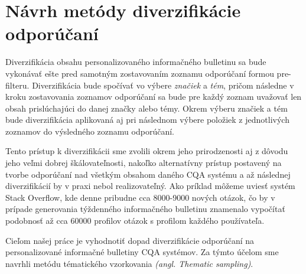 \section{Návrh metódy diverzifikácie odporúčaní}

Diverzifikácia obsahu personalizovaného informačného bulletinu sa bude vykonávať ešte pred samotným zostavovaním
zoznamu odporúčaní formou pre-filteru. Diverzifikácia bude spočívať vo výbere \textit{značiek} a \textit{tém}, pričom
následne v kroku zostavovania zoznamov odporúčaní sa bude pre každý zoznam uvažovať len obsah prislúchajúci do danej
značky alebo témy. Okrem výberu značiek a tém bude diverzifikácia aplikovaná aj pri následnom výbere položiek z jednotlivých
zoznamov do výsledného zoznamu odporúčaní.

Tento prístup k diverzifikácii sme zvolili okrem jeho prirodzenosti aj z dôvodu jeho veľmi dobrej škálovateľnosti,
nakoľko alternatívny prístup postavený na tvorbe odporúčaní nad všetkým obsahom daného CQA systému a až následnej
diverzifikácií by v praxi nebol realizovateľný. Ako príklad môžeme uviesť systém Stack Overflow, kde denne pribudne
cca 8000-9000 nových otázok, čo by v prípade generovania týždenného informačného bulletinu znamenalo vypočítať podobnosť
až cca 60000 profilov otázok s profilom každého používateľa.

Cieľom našej práce je vyhodnotiť dopad diverzifikácie odporúčaní na personalizované informačné bulletiny CQA systémov.
Za týmto účelom sme navrhli metódu tématického vzorkovania \textit{(angl. Thematic sampling)}.

